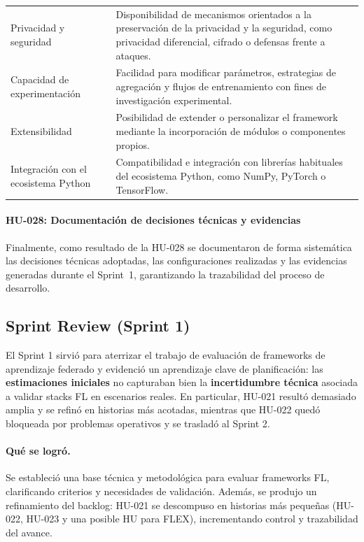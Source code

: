 \documentclass{report}
\begin{document}
\begin{table}[H]
\begin{tabularx}{\linewidth}{@{}p{3.6cm} >{\RaggedRight\arraybackslash}X @{}}
Privacidad y seguridad
& Disponibilidad de mecanismos orientados a la preservación de la privacidad y la seguridad, como privacidad diferencial, cifrado o defensas frente a ataques. \\

Capacidad de experimentación
& Facilidad para modificar parámetros, estrategias de agregación y flujos de entrenamiento con fines de investigación experimental. \\

Extensibilidad
& Posibilidad de extender o personalizar el framework mediante la incorporación de módulos o componentes propios. \\

Integración con el ecosistema Python
& Compatibilidad e integración con librerías habituales del ecosistema Python, como NumPy, PyTorch o TensorFlow. \\
\bottomrule
\end{tabularx}
\end{table}

\paragraph{HU-028: Documentación de decisiones técnicas y evidencias}
Finalmente, como resultado de la HU-028 se documentaron de forma sistemática las decisiones técnicas adoptadas, las configuraciones realizadas y las evidencias generadas durante el Sprint~1, garantizando la trazabilidad del proceso de desarrollo.



\subsection{Sprint Review (Sprint 1)}
El Sprint 1 sirvió para aterrizar el trabajo de evaluación de frameworks de aprendizaje federado y evidenció un aprendizaje clave de planificación: las \textbf{estimaciones iniciales} no capturaban bien la \textbf{incertidumbre técnica} asociada a validar stacks FL en escenarios reales. En particular, HU-021 resultó demasiado amplia y se refinó en historias más acotadas, mientras que HU-022 quedó bloqueada por problemas operativos y se trasladó al Sprint 2.

\vspace{0.15em}
\paragraph{Qué se logró.}
Se estableció una base técnica y metodológica para evaluar frameworks FL, clarificando criterios y necesidades de validación. Además, se produjo un refinamiento del backlog: HU-021 se descompuso en historias más pequeñas (HU-022, HU-023 y una posible HU para FLEX), incrementando control y trazabilidad del avance.
\end{document}
